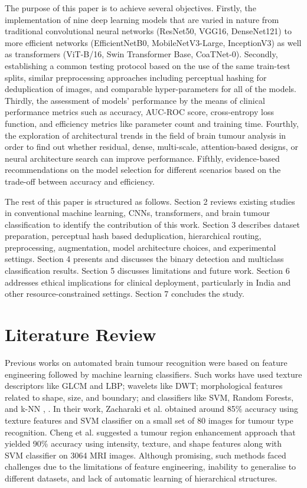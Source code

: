 \documentclass[final,3p,times,number]{elsarticle}
\begin{document}
The purpose of this paper is to achieve several objectives. Firstly, the implementation of nine deep learning models that are varied in nature from traditional convolutional neural networks (ResNet50, VGG16, DenseNet121) to more efficient networks (EfficientNetB0, MobileNetV3-Large, InceptionV3) as well as transformers (ViT-B/16, Swin Transformer Base, CoaTNet-0). Secondly, establishing a common testing protocol based on the use of the same train-test splits, similar preprocessing approaches including perceptual hashing for deduplication of images, and comparable hyper-parameters for all of the models. Thirdly, the assessment of models' performance by the means of clinical performance metrics such as accuracy, AUC-ROC score, cross-entropy loss function, and efficiency metrics like parameter count and training time. Fourthly, the exploration of architectural trends in the field of brain tumour analysis in order to find out whether residual, dense, multi-scale, attention-based designs, or neural architecture search can improve performance. Fifthly, evidence-based recommendations on the model selection for different scenarios based on the trade-off between accuracy and efficiency.

The rest of this paper is structured as follows. Section 2 reviews existing studies in conventional machine learning, CNNs, transformers, and brain tumour classification to identify the contribution of this work. Section 3 describes dataset preparation, perceptual hash based deduplication, hierarchical routing, preprocessing, augmentation, model architecture choices, and experimental settings. Section 4 presents and discusses the binary detection and multiclass classification results. Section 5 discusses limitations and future work. Section 6 addresses ethical implications for clinical deployment, particularly in India and other resource-constrained settings. Section 7 concludes the study.

\section{Literature Review}

Previous works on automated brain tumour recognition were based on feature engineering followed by machine learning classifiers. Such works have used texture descriptors like GLCM and LBP; wavelets like DWT; morphological features related to shape, size, and boundary; and classifiers like SVM, Random Forests, and k-NN \cite{ref2}, \cite{ref3}. In their work, Zacharaki et al. \cite{ref1} obtained around 85\% accuracy using texture features and SVM classifier on a small set of 80 images for tumour type recognition. Cheng et al. \cite{ref5} suggested a tumour region enhancement approach that yielded 90\% accuracy using intensity, texture, and shape features along with SVM classifier on 3064 MRI images. Although promising, such methods faced challenges due to the limitations of feature engineering, inability to generalise to different datasets, and lack of automatic learning of hierarchical structures.
\end{document}
